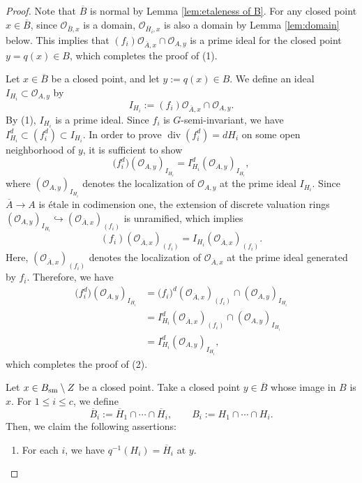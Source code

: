 \documentclass[a4paper,11pt]{amsart}
\theoremstyle{definition}
\theoremstyle{remark}
\begin{document}
\begin{proof}
Note that $\overline{B}$ is normal by Lemma \ref{lem:etaleness of B}.
For any closed point $x \in \overline{B}$, since $\mathcal O_{\overline{B}, x}$ is a domain, $\mathcal O_{\overline{H}_i, x}$ is also a domain by Lemma \ref{lem:domain} below.
This implies that $(f_i) \mathcal{O}_{\overline{A}, x} \cap \mathcal O_{A, y}$ is a prime ideal for the closed point $y = q(x) \in B$,
which completes the proof of (1). 

Let $x \in \overline{B}$ be a closed point, and let $y := q(x) \in B$. 
We define an ideal $I_{H_i} \subset \mathcal{O}_{A,y}$ by
\[
I_{H_i} := (f_i) \mathcal{O}_{\overline{A}, x} \cap \mathcal{O}_{A,y}. 
\]
By (1), $I_{H_i}$ is a prime ideal. 
Since $f_i$ is $G$-semi-invariant, we have $I_{H_i}^d \subset \left( f_i ^d \right) \subset I_{H_i}$. 
In order to prove $\operatorname{div} \left( f_i ^d \right) = d H_i$ on some open neighborhood of $y$, 
it is sufficient to show 
\[
\bigl( f^d_i \bigr) (\mathcal{O}_{A,y})_{I_{H_i}} =
I_{H_i} ^d (\mathcal{O}_{A,y})_{I_{H_i}}, 
\] 
where $(\mathcal{O}_{A,y})_{I_{H_i}}$ denotes the localization of $\mathcal{O}_{A,y}$ at the prime ideal $I_{H_i}$. 
Since $\overline{A} \to A$ is  \'{e}tale in codimension one, 
the extension of discrete valuation rings 
$(\mathcal{O}_{A,y})_{I_{H_i}} \hookrightarrow (\mathcal{O}_{\overline{A}, x})_{( f_i )}$
is unramified, which implies
\[
( f_i ) (\mathcal{O}_{\overline{A}, x})_{( f_i )} 
= I_{H_i} (\mathcal{O}_{\overline{A}, x})_{( f_i )}. 
\]
Here, $(\mathcal{O}_{\overline{A}, x})_{( f_i )}$ denotes the localization of $\mathcal{O}_{\overline{A}, x}$ at the prime ideal generated by $f_i$. 
Therefore, we have
\begin{align*}
\bigl( f^d_i \bigr) (\mathcal{O}_{A,y})_{I_{H_i}}
&= 
\bigl( f_i \bigr) ^d  (\mathcal{O}_{\overline{A}, x})_{( f_i )} \cap (\mathcal{O}_{A,y})_{I_{H_i}} \\
&= 
I_{H_i} ^d  (\mathcal{O}_{\overline{A}, x})_{( f_i )} \cap (\mathcal{O}_{A,y})_{I_{H_i}} \\
&=
I_{H_i} ^d (\mathcal{O}_{A,y})_{I_{H_i}}, 
\end{align*}
which completes the proof of (2). 



Let $x \in B_{\rm sm} \setminus Z$ be a closed point.
Take a closed point $y \in \overline{B}$ whose image in $B$ is $x$.
For $1 \le i \le c$, we define 
\[
\overline{B}_i := \overline{H}_1\cap \cdots \cap \overline{H}_i, \qquad 
B_i := H_1\cap \cdots \cap H_i. 
\]
Then, we claim the following assertions: 
\begin{enumerate}
\item[(i)] 
For each $i$, we have $q^{-1}(H_i) = \overline{H}_i$ at $y$. 


\end{enumerate}
\end{proof}
\end{document}
